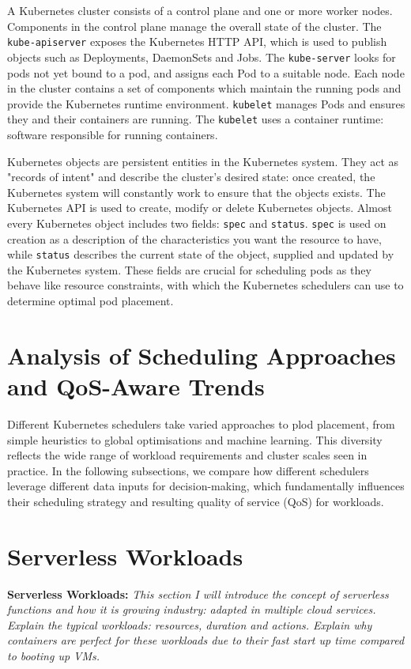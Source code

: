 A Kubernetes cluster consists of a control plane and one or more worker nodes.
Components in the control plane manage the overall state of the cluster. The
\verb|kube-apiserver| exposes the Kubernetes HTTP API, which is used to publish
objects such as Deployments, DaemonSets and Jobs. The \verb|kube-server| looks
for pods not yet bound to a pod, and assigns each Pod to a suitable node. Each
node in the cluster contains a set of components which maintain the running pods
and provide the Kubernetes runtime environment. \verb|kubelet| manages Pods and
ensures they and their containers are running. The \verb|kubelet| uses a
container runtime: software responsible for running containers.

Kubernetes objects are persistent entities in the Kubernetes system. They act as
"records of intent" and describe the cluster's desired state: once created, the
Kubernetes system will constantly work to ensure that the objects exists. The
Kubernetes API is used to create, modify or delete Kubernetes objects. Almost
every Kubernetes object includes two fields: \verb|spec| and \verb|status|.
\verb|spec| is used on creation as a description of the characteristics you want
the resource to have, while \verb|status| describes the current state of the
object, supplied and updated by the Kubernetes system. These fields are crucial
for scheduling pods as they behave like resource constraints, with which the
Kubernetes schedulers can use to determine optimal pod placement.

\section{Analysis of Scheduling Approaches and QoS-Aware Trends}
Different Kubernetes schedulers take varied approaches to plod placement, from
simple heuristics to global optimisations and machine learning. This diversity
reflects the wide range of workload requirements and cluster scales seen in
practice. In the following subsections, we compare how different schedulers
leverage different data inputs for decision-making, which fundamentally
influences their scheduling strategy and resulting quality of service (QoS) for
workloads.

\section{Serverless Workloads}
\begin{tcolorbox}[boxsep=0mm,left=2.5mm,right=2.5mm] \textbf{Serverless
    Workloads:} {\em This section I will introduce the concept of serverless
    functions and how it is growing industry: adapted in multiple cloud
    services. Explain the typical workloads: resources, duration and actions.
Explain why containers are perfect for these workloads due to their fast start
up time compared to booting up VMs.}  \end{tcolorbox}


